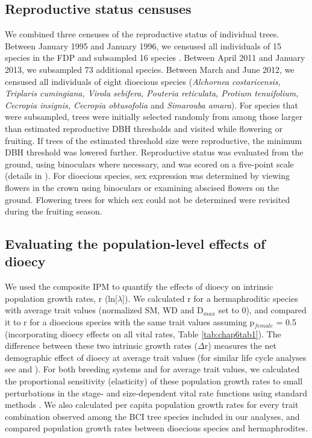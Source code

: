 \documentclass[b5paper,justified]{tufte-book} %
\begin{document}
\begin{fullwidth}
\subsection{Reproductive status censuses}
We combined three censuses of the reproductive status of individual trees. Between January 1995 and January 1996, we censused all individuals of 15 species in the FDP and subsampled 16 species \citep{Wright2005}. Between April 2011 and January 2013, we subsampled 73 additional species. Between March and June 2012, we censused all individuals of eight dioecious species (\textit{Alchornea costaricensis, Triplaris cumingiana, Virola sebifera, Pouteria reticulata, Protium tenuifolium, Cecropia insignis, Cecropia obtusofolia} and \textit{Simarouba amara}). For species that were subsampled, trees were initially selected randomly from among those larger than estimated reproductive DBH thresholds and visited while flowering or fruiting. If trees of the estimated threshold size were reproductive, the minimum DBH threshold was lowered further. Reproductive status was evaluated from the ground, using binoculars where necessary, and was scored on a five-point scale (details in \citealt{Wright2005}). For dioecious species, sex expression was determined by viewing flowers in the crown using binoculars or examining abscised flowers on the ground. Flowering trees for which sex could not be determined were revisited during the fruiting season.

\subsection{Evaluating the population-level effects of dioecy}
We used the composite IPM to quantify the effects of dioecy on intrinsic population growth rates, r (ln[$\lambda$]).  We calculated r for a hermaphroditic species with average trait values (normalized SM, WD and D$_{max}$ set to 0), and compared it to r for a dioecious species with the same trait values assuming p$_{female}$ = 0.5 (incorporating dioecy effects on all vital rates, Table \ref{tab:chap6tab1}).  The difference between these two intrinsic growth rates ($\Delta$r) measures the net demographic effect of dioecy at average trait values (for similar life cycle analyses see \citealt{Metcalf2007} and \citealt{Visser2011}).  For both breeding systems and for average trait values, we calculated the proportional sensitivity (elasticity) of these population growth rates to small perturbations in the stage- and size-dependent vital rate functions using standard methods \citep{DeKroon1986, Easterling2000}. We also calculated per capita population growth rates for every trait combination observed among the BCI tree species included in our analyses, and compared population growth rates between dioecious species and hermaphrodites.
   

\end{fullwidth}
\end{document}
